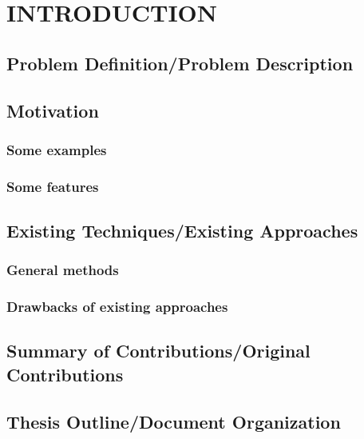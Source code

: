 \documentclass[12pt,reqno,oneside]{pucthesis}         %
\begin{document}




\chapter[INTRODUCTION]{INTRODUCTION}
\section{Problem Definition/Problem Description}
\section{Motivation}
\subsection{Some examples}
\subsection{Some features}
\section{Existing Techniques/Existing Approaches}
\subsection{General methods}
\subsection{Drawbacks of existing approaches}
\section{Summary of Contributions/Original Contributions}
\section{Thesis Outline/Document Organization}
\end{document}
